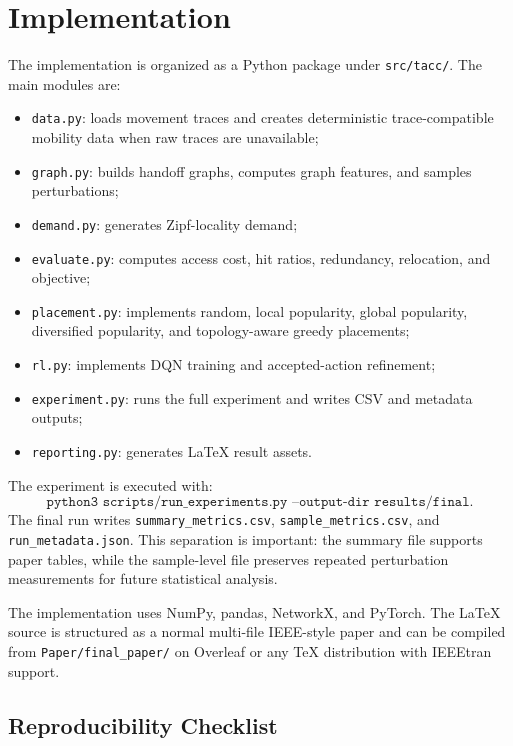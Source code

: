 \section{Implementation}

The implementation is organized as a Python package under \texttt{src/tacc/}. The main modules are:
\begin{itemize}
    \item \texttt{data.py}: loads movement traces and creates deterministic trace-compatible mobility data when raw traces are unavailable;
    \item \texttt{graph.py}: builds handoff graphs, computes graph features, and samples perturbations;
    \item \texttt{demand.py}: generates Zipf-locality demand;
    \item \texttt{evaluate.py}: computes access cost, hit ratios, redundancy, relocation, and objective;
    \item \texttt{placement.py}: implements random, local popularity, global popularity, diversified popularity, and topology-aware greedy placements;
    \item \texttt{rl.py}: implements DQN training and accepted-action refinement;
    \item \texttt{experiment.py}: runs the full experiment and writes CSV and metadata outputs;
    \item \texttt{reporting.py}: generates LaTeX result assets.
\end{itemize}

The experiment is executed with:
\[
\texttt{python3 scripts/run\_experiments.py --output-dir results/final}.
\]
The final run writes \texttt{summary\_metrics.csv}, \texttt{sample\_metrics.csv}, and \texttt{run\_metadata.json}. This separation is important: the summary file supports paper tables, while the sample-level file preserves repeated perturbation measurements for future statistical analysis.

The implementation uses NumPy, pandas, NetworkX, and PyTorch. The LaTeX source is structured as a normal multi-file IEEE-style paper and can be compiled from \texttt{Paper/final\_paper/} on Overleaf or any TeX distribution with IEEEtran support.

\subsection{Reproducibility Checklist}

